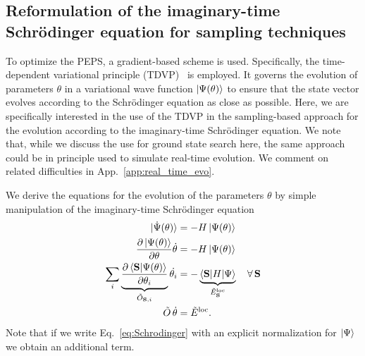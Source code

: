 \documentclass[aps,notitlepage,twocolumn,nofootinbib,superscriptaddress,pra,10pt]{revtex4-2}
\begin{document}
\subsection{Reformulation of the imaginary-time Schrödinger equation for sampling techniques}
\label{sec:imaginary_schrodinger_eq}

To optimize the PEPS, a gradient-based scheme is used. Specifically, the time-dependent variational principle (TDVP)~\cite{sorella2007weak, haegeman2011time, Carleo17_NQS, Vanderstraeten19TDVP} is employed. It governs the evolution of parameters $\theta$ in a variational wave function $\ket{\Psi(\theta)}$ to ensure that the state vector evolves according to the Schrödinger equation as close as possible. Here, we are specifically interested in the use of the TDVP in the sampling-based approach for the evolution according to the imaginary-time Schrödinger equation. 
We note that, while we discuss the use for ground state search here, the same approach could be in principle used to simulate real-time evolution. 
We comment on related difficulties in App.~\ref{app:real_time_evo}.

We derive the equations for the evolution of the parameters $\theta$ by simple manipulation of the imaginary-time Schrödinger equation
\begin{align}
    \ket{\dot{\Psi}(\theta)} &= -H \ket{\Psi(\theta)} \label{eq:Schrodinger}\\
    \frac{\partial \ket{\Psi(\theta)}}{\partial \theta} \dot{\theta} &= -H \ket{\Psi(\theta)} \\
    \sum_i \underbrace{\frac{\partial \braket{\textbf{S}|\Psi(\theta)}}{\partial \theta_i}}_{\tilde{O}_{\textbf{S},i}} \dot{\theta_i} &= -\underbrace{\braket{\textbf{S}|H|\Psi}}_{\tilde{E}^\text{loc}_\textbf{S}} \quad \forall \, \mathbf{S}\\
    \tilde{O} \, \dot{\theta} &= \tilde{E}^\text{loc}. \label{eq:tdvp}
\end{align}
%
Note that if we write Eq.~\eqref{eq:Schrodinger} with an explicit normalization for $\ket{\Psi}$ we obtain an additional term.
\end{document}
